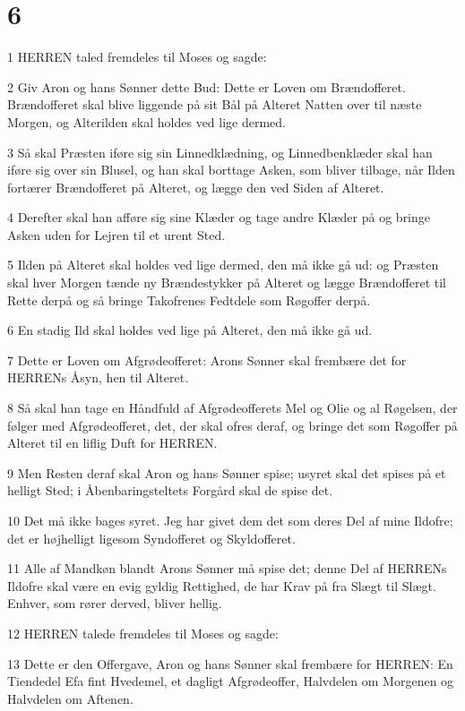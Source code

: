 \chapter{6}

\par 1 HERREN taled fremdeles til Moses og sagde:
\par 2 Giv Aron og hans Sønner dette Bud: Dette er Loven om Brændofferet. Brændofferet skal blive liggende på sit Bål på Alteret Natten over til næste Morgen, og Alterilden skal holdes ved lige dermed.
\par 3 Så skal Præsten iføre sig sin Linnedklædning, og Linnedbenklæder skal han iføre sig over sin Blusel, og han skal borttage Asken, som bliver tilbage, når Ilden fortærer Brændofferet på Alteret, og lægge den ved Siden af Alteret.
\par 4 Derefter skal han afføre sig sine Klæder og tage andre Klæder på og bringe Asken uden for Lejren til et urent Sted.
\par 5 Ilden på Alteret skal holdes ved lige dermed, den må ikke gå ud: og Præsten skal hver Morgen tænde ny Brændestykker på Alteret og lægge Brændofferet til Rette derpå og så bringe Takofrenes Fedtdele som Røgoffer derpå.
\par 6 En stadig Ild skal holdes ved lige på Alteret, den må ikke gå ud.
\par 7 Dette er Loven om Afgrødeofferet: Arons Sønner skal frembære det for HERRENs Åsyn, hen til Alteret.
\par 8 Så skal han tage en Håndfuld af Afgrødeofferets Mel og Olie og al Røgelsen, der følger med Afgrødeofferet, det, der skal ofres deraf, og bringe det som Røgoffer på Alteret til en liflig Duft for HERREN.
\par 9 Men Resten deraf skal Aron og hans Sønner spise; usyret skal det spises på et helligt Sted; i Åbenbaringsteltets Forgård skal de spise det.
\par 10 Det må ikke bages syret. Jeg har givet dem det som deres Del af mine Ildofre; det er højhelligt ligesom Syndofferet og Skyldofferet.
\par 11 Alle af Mandkøn blandt Arons Sønner må spise det; denne Del af HERRENs Ildofre skal være en evig gyldig Rettighed, de har Krav på fra Slægt til Slægt. Enhver, som rører derved, bliver hellig.
\par 12 HERREN talede fremdeles til Moses og sagde:
\par 13 Dette er den Offergave, Aron og hans Sønner skal frembære for HERREN: En Tiendedel Efa fint Hvedemel, et dagligt Afgrødeoffer, Halvdelen om Morgenen og Halvdelen om Aftenen.
